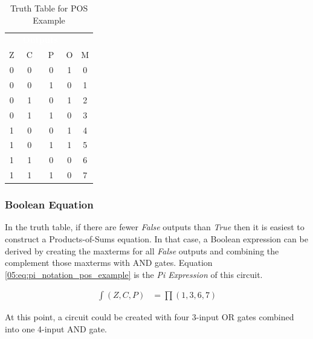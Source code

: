\begin{table}[H]
  \sffamily
  \newcommand{\head}[1]{\textcolor{white}{\textbf{#1}}}    
  \begin{center}
    \begin{tabular}{ccc|cc} 
      \rowcolor{black!75}
      \multicolumn{3}{c}{\head{Inputs}} & \multicolumn{2}{c}{\head{Outputs}} \\
      Z & C & P & O & M \\
      \hline
      0 & 0 & 0 & 1 & 0 \\
      0 & 0 & 1 & 0 & 1 \\
      0 & 1 & 0 & 1 & 2 \\
      0 & 1 & 1 & 0 & 3 \\
      1 & 0 & 0 & 1 & 4 \\
      1 & 0 & 1 & 1 & 5 \\
      1 & 1 & 0 & 0 & 6 \\
      1 & 1 & 1 & 0 & 7 
    \end{tabular}
  \end{center}
  \caption{Truth Table for POS Example}
  \label{05:tab:truth_table_for_pos_example}
\end{table}

\subsubsection{Boolean Equation}
\label{05:subsubsec:boolean_equation_pos_example}

In the truth table, if there are fewer \emph{False} outputs than \emph{True} then it is easiest to construct a Products-of-Sums equation. In that case, a Boolean expression can be derived by creating the maxterms for all \emph{False} outputs and combining the complement those maxterms with \textsf{AND}  gates. Equation \ref{05:eq:pi_notation_pos_example} is the \emph{Pi Expression} of this circuit.

\begin{align}
  \label{05:eq:pi_notation_pos_example}
  \int(Z,C,P) &= \prod(1,3,6,7)
\end{align}


At this point, a circuit could be created with four 3-input \textsf{OR}  gates combined into one 4-input \textsf{AND}  gate.

